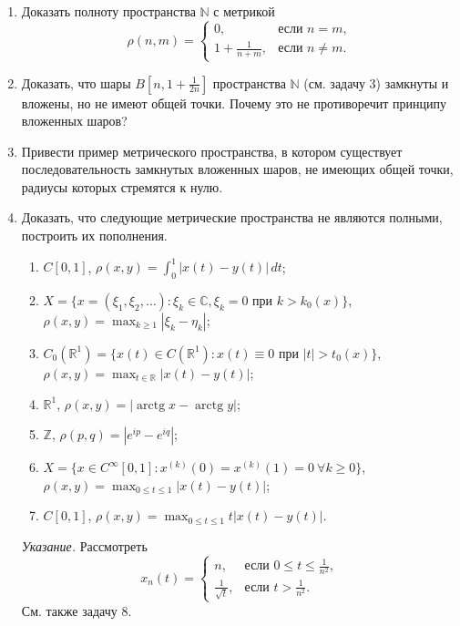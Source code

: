 \documentclass[12pt,a4paper]{article}
\begin{document}
\begin{enumerate}
\item Доказать полноту пространства $\mathbb{N}$ с метрикой
$$\rho(n, m) =
\begin{cases} 0, & \text{если } n=m, \\ 1 + \frac{1}{n+m}, & \text{если } n \ne m.
\end{cases}$$

\item Доказать, что шары $B[n, 1+\frac{1}{2n}]$ пространства $\mathbb{N}$ (см. задачу 3) замкнуты и вложены, но не имеют общей точки. Почему это не противоречит принципу вложенных шаров?

\item Привести пример метрического пространства, в котором существует последовательность замкнутых вложенных шаров, не имеющих общей точки, радиусы которых стремятся к нулю.

\item Доказать, что следующие метрические пространства не являются полными, построить их пополнения.
\begin{enumerate}[label=\alph*)]
\item $C[0, 1]$, $\rho(x, y) = \int_{0}^{1} |x(t) - y(t)| \, dt$;
\item $X = \{x = (\xi_{1}, \xi_{2}, \dots) : \xi_{k} \in \mathbb{C}, \xi_{k}=0 \text{ при } k > k_{0}(x)\}$, \\ $\rho(x, y) = \max_{k\ge1} |\xi_{k} - \eta_{k}|$;
\item $C_{0}(\mathbb{R}^{1}) = \{x(t) \in C(\mathbb{R}^{1}) : x(t) \equiv 0 \text{ при } |t| > t_{0}(x)\}$, \\ $\rho(x, y) = \max_{t\in\mathbb{R}} |x(t) - y(t)|$;
\item $\mathbb{R}^{1}$, $\rho(x, y) = |\operatorname{arctg} x - \operatorname{arctg} y|$;
\item $\mathbb{Z}$, $\rho(p, q) = |e^{ip} - e^{iq}|$;
\item $X = \{x \in C^{\infty}[0, 1] : x^{(k)}(0) = x^{(k)}(1) = 0 \ \forall k \ge 0\}$, \\ $\rho(x, y) = \max_{0\le t\le1} |x(t) - y(t)|$;
\item $C[0, 1]$, $\rho(x, y) = \max_{0\le t\le1} t|x(t) - y(t)|$.
\end{enumerate}
\textit{Указание.} Рассмотреть
$$x_{n}(t) =
\begin{cases} n, & \text{если } 0 \le t \le \frac{1}{n^{2}}, \\ \frac{1}{\sqrt{t}}, & \text{если } t > \frac{1}{n^{2}}.
\end{cases}$$
См. также задачу 8.
\end{enumerate}
\end{document}

